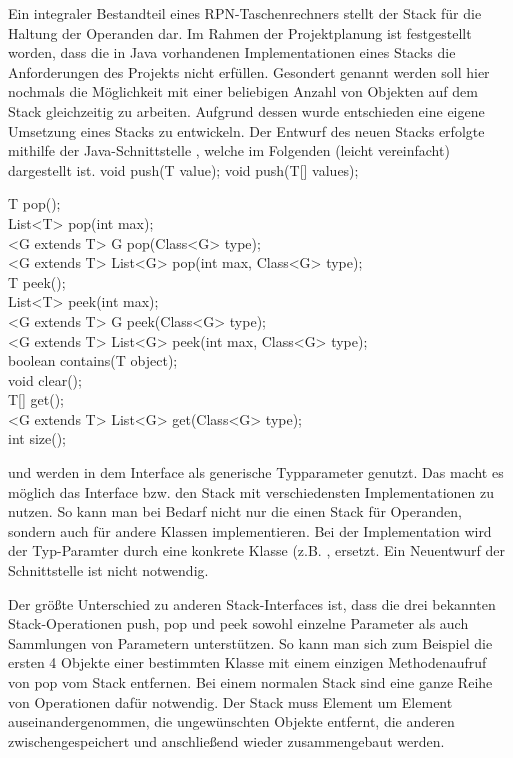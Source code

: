 Ein integraler Bestandteil eines RPN-Taschenrechners stellt der Stack für die Haltung der Operanden dar. Im Rahmen der Projektplanung ist festgestellt worden, dass die in Java vorhandenen Implementationen eines Stacks die Anforderungen des Projekts nicht erfüllen. Gesondert genannt werden soll hier nochmals die Möglichkeit mit einer beliebigen Anzahl von Objekten auf dem Stack gleichzeitig zu arbeiten. Aufgrund dessen wurde entschieden eine eigene Umsetzung eines Stacks zu entwickeln. Der Entwurf des neuen Stacks erfolgte mithilfe der Java-Schnittstelle , welche im Folgenden (leicht vereinfacht) dargestellt ist.
void push(T value);
void push(T[] values);


T pop();\\
List<T> pop(int max);\\
<G extends T> G pop(Class<G> type);\\
<G extends T> List<G> pop(int max, Class<G> type);\\
T peek();\\
List<T> peek(int max); \\
<G extends T> G peek(Class<G> type); \\
<G extends T> List<G> peek(int max, Class<G> type); \\
boolean contains(T object); \\
void clear(); \\
T[] get(); \\
<G extends T> List<G> get(Class<G> type);\\
int size();

 und  werden in dem Interface als generische Typparameter genutzt. Das macht es möglich das Interface bzw. den Stack mit verschiedensten Implementationen zu nutzen. So kann man bei Bedarf nicht nur die einen Stack für Operanden, sondern auch für andere Klassen implementieren. Bei der Implementation wird der Typ-Paramter  durch eine konkrete Klasse (z.B. , ersetzt. Ein Neuentwurf der Schnittstelle ist nicht notwendig. 

Der größte Unterschied zu anderen Stack-Interfaces ist, dass die drei bekannten Stack-Operationen push, pop und peek sowohl einzelne Parameter als auch Sammlungen von Parametern unterstützen. So kann man sich zum Beispiel die ersten 4 Objekte einer bestimmten Klasse mit einem einzigen Methodenaufruf von pop vom Stack entfernen. Bei einem normalen Stack sind eine ganze Reihe von Operationen dafür notwendig. Der Stack muss Element um Element auseinandergenommen, die ungewünschten Objekte entfernt, die anderen zwischengespeichert und anschließend wieder zusammengebaut werden.

